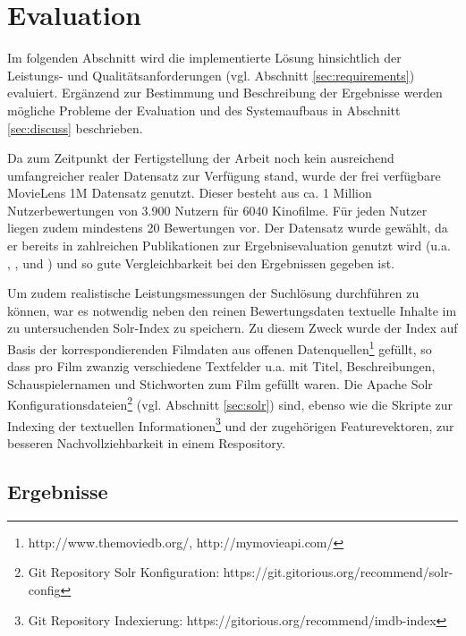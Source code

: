 \newpage \section{Evaluation}\label{sec:evaluation}


Im folgenden Abschnitt wird die implementierte Lösung hinsichtlich der Leistungs- und Qualitätsanforderungen (vgl. Abschnitt \ref{sec:requirements}) evaluiert. Ergänzend zur Bestimmung und Beschreibung der Ergebnisse werden mögliche Probleme der Evaluation und des Systemaufbaus in Abschnitt \ref{sec:discuss} beschrieben.

Da zum Zeitpunkt der Fertigstellung der Arbeit noch kein ausreichend umfangreicher realer Datensatz zur Verfügung stand, wurde der frei verfügbare MovieLens 1M \citep{movielens1m} Datensatz genutzt. Dieser besteht aus ca. 1 Million Nutzerbewertungen von 3.900 Nutzern für 6040 Kinofilme. Für jeden Nutzer liegen zudem mindestens 20 Bewertungen vor. Der Datensatz wurde gewählt, da er bereits in zahlreichen Publikationen zur Ergebnisevaluation genutzt wird  (u.a.  \citep{Cacheda2011}, \citep{Candillier:2008}, \citep{Paterek07} und \citep{Herlocker:1999:AFP:312624.312682}) und so gute Vergleichbarkeit bei den Ergebnissen gegeben ist.

Um zudem realistische Leistungsmessungen der Suchlösung durchführen zu können, war es notwendig neben den reinen Bewertungsdaten textuelle Inhalte im zu untersuchenden Solr-Index zu speichern. Zu diesem Zweck wurde der Index auf Basis der korrespondierenden Filmdaten aus offenen Datenquellen\footnote{http://www.themoviedb.org/, http://mymovieapi.com/} gefüllt, so dass pro Film zwanzig verschiedene Textfelder u.a. mit Titel, Beschreibungen, Schauspielernamen und Stichworten zum Film gefüllt waren. Die Apache Solr Konfigurationsdateien\footnote{Git Repository Solr Konfiguration: https://git.gitorious.org/recommend/solr-config} (vgl. Abschnitt \ref{sec:solr}) sind, ebenso wie die Skripte zur Indexing der textuellen Informationen\footnote{Git Repository Indexierung: https://gitorious.org/recommend/imdb-index} und der zugehörigen Featurevektoren, zur besseren Nachvollziehbarkeit in einem Respository.

\newpage
\subsection{Ergebnisse}

